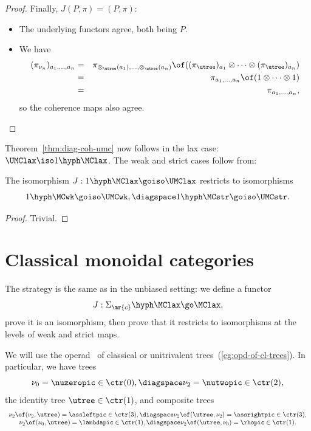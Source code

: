 \begin{proof}
Finally, $J(P,\pi) = (P,\pi)$:
%
\begin{itemize}
\item The underlying functors agree, both being $P$.
\item We have
%
\begin{eqnarray*}
(\pi_{\nu_n})_{a_1, \ldots, a_n} &=	&
\pi_{\otimes_\utree(a_1), \ldots, \otimes_\utree(a_n)}
\of
((\pi_\utree)_{a_1} \otimes\cdots\otimes (\pi_\utree)_{a_n})	\\
	&=	&
\pi_{a_1, \ldots, a_n} \of (1 \otimes\cdots\otimes 1)	\\
	&=	&
\pi_{a_1, \ldots, a_n},
\end{eqnarray*}
so the coherence maps also agree.
\done
\end{itemize}
\end{proof}%
%
%

Theorem~\ref{thm:diag-coh-umc} now follows in the lax case: $\UMClax \iso
1\hyph\MClax$.  The weak and strict cases follow from:

\begin{lemma}	
The isomorphism $J: 1\hyph\MClax \goiso \UMClax$ restricts to 
isomorphisms
\[
1\hyph\MCwk \goiso \UMCwk,
\diagspace
1\hyph\MCstr \goiso \UMCstr.
\]
\end{lemma}

\begin{proof}
Trivial.
\done
\end{proof}%
%
%




\section{Classical monoidal categories}
%
%
%

The strategy is the same as in the unbiased setting: we define
a functor
\[
J: \Sigma_\mr{c}\hyph\MClax \go \MClax,
\]
prove it is an isomorphism, then prove that it restricts to isomorphisms at
the levels of weak and strict maps.

%
%
We will use the operad \ctr\ of classical or unitrivalent
trees~(\ref{eg:opd-of-cl-trees}).  In particular, we have trees
\[
\nu_0 = \nuzeropic \in \ctr(0), 
\diagspace
\nu_2 = \nutwopic \in \ctr(2), 
\]
the identity tree $\utree\in\ctr(1)$, and composite trees
\[
\begin{array}{c}
\nu_2 \of (\nu_2, \utree) = \assleftpic \in \ctr(3),
\diagspace
\nu_2 \of (\utree, \nu_2) = \assrightpic \in \ctr(3),\\
\nu_2 \of (\nu_0, \utree) = \lambdapic \in \ctr(1),
\diagspace
\nu_2 \of (\utree, \nu_0) = \rhopic \in \ctr(1).
\end{array}
\]

